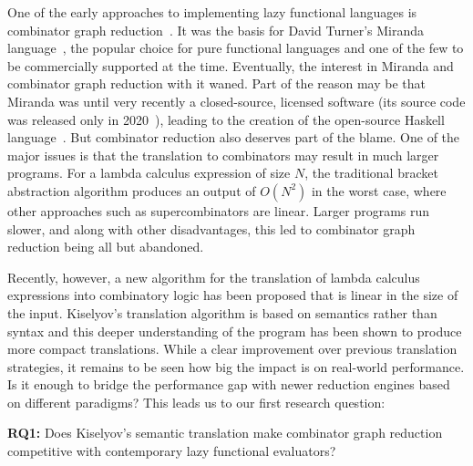 \documentclass[conference]{IEEEtran}
\begin{document}
One of the early approaches to implementing lazy functional languages is combinator graph reduction~\cite{turner_new_1979}.
It was the basis for David Turner's Miranda language~\cite{turner_miranda_1985}, the popular choice for pure functional languages and one of the few to be commercially supported at the time.
Eventually, the interest in Miranda and combinator graph reduction with it waned.
Part of the reason may be that Miranda was until very recently a closed-source, licensed software (its source code was released only in 2020~\cite{noauthor_open_2021}), leading to the creation of the open-source Haskell language~\cite{hudak_history_2007}.
But combinator reduction also deserves part of the blame.
One of the major issues is that the translation to combinators may result in much larger programs.
For a lambda calculus expression of size $N$, the traditional bracket abstraction algorithm produces an output of $O(N^2)$ in the worst case, where other approaches such as supercombinators are linear\cite{spj_impl}.
Larger programs run slower, and along with other disadvantages, this led to combinator graph reduction being all but abandoned.

Recently, however, a new algorithm for the translation of lambda calculus expressions into combinatory logic has been proposed that is linear in the size of the input\cite{kiselyov_lambda_2018}.
Kiselyov's translation algorithm is based on semantics rather than syntax and this deeper understanding of the program has been shown to produce more compact translations.
While a clear improvement over previous translation strategies, it remains to be seen how big the impact is on real-world performance.
Is it enough to bridge the performance gap with newer reduction engines based on different paradigms?
This leads us to our first research question:

\textbf{RQ1:} Does Kiselyov's semantic translation make combinator graph reduction competitive with contemporary lazy functional evaluators?
\end{document}
